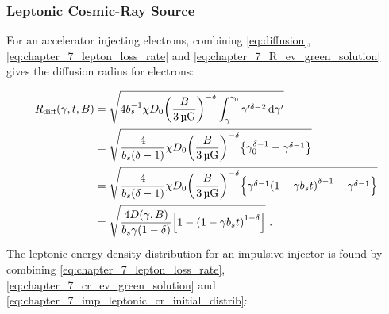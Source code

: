 \subsubsection{Leptonic Cosmic-Ray Source}

For an accelerator injecting electrons, combining \autoref{eq:diffusion},  \autoref{eq:chapter_7_lepton_loss_rate} and \autoref{eq:chapter_7_R_ev_green_solution} gives the diffusion radius for electrons:

\begin{equation}
	\begin{aligned}
		R_\text{diff}\qty(\gamma,t,B)&=\sqrt{4b_s^{-1} \chi D_0\qty(\frac{B}{3\,\si{\micro G}})^{-\delta}\int_\gamma^{\gamma_0}\gamma'^{\delta-2}\dd{\gamma'}} \\
		&=\sqrt{\frac{4}{b_s(\delta-1)} \chi D_0\qty(\frac{B}{3\,\si{\micro G}})^{-\delta} \qty{\gamma_0^{\delta-1}-\gamma^{\delta-1}} } \\
		&=\sqrt{\frac{4}{b_s(\delta-1)} \chi D_0\qty(\frac{B}{3\,\si{\micro G}})^{-\delta} \qty{\gamma^{\delta-1}\qty(1-\gamma b_st)^{\delta-1}-\gamma^{\delta-1}} } \\
		&=\sqrt{\frac{4D\qty(\gamma,B)}{b_s\gamma\qty(1-\delta)}\qty[1-\qty(1-\gamma b_s t)^{1-\delta}]}\text{ .}
	\end{aligned} \label{eq:chapter_7_Rdiff_leptonic_impulsive}
\end{equation} 
\noindent The leptonic energy density distribution for an impulsive injector is found by combining \autoref{eq:chapter_7_lepton_loss_rate}, \autoref{eq:chapter_7_cr_ev_green_solution} and \autoref{eq:chapter_7_imp_leptonic_cr_initial_distrib}:

